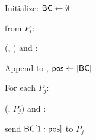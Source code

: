 \begin{bbox}[title={$\mathcal{F}_\msf{Atomic}$}]

Initialize: ${\mathsf {BC}} \leftarrow \emptyset$

\OnInput {} from $P_i$:

    \quad \Leak (, \Partyi) and \Eventually:
    
    	\qquad Append  to , ${\mathsf {pos}} \leftarrow |{\mathsf {BC}}|$
    	
    	\qquad For each $P_j$:
    	    
    	    \qqquad \Leak (, $P_j$) and \Eventually: 

			\qqqquad send ${\mathsf {BC}}[1:{\mathsf {pos}}]$ to $P_j$
    
        
\end{bbox}
